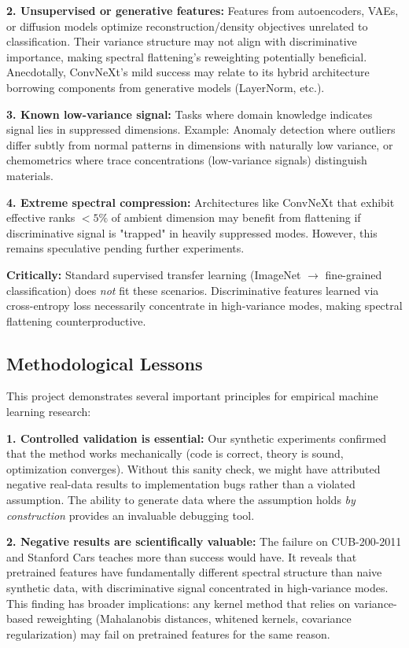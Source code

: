 \documentclass[11pt]{article}
\begin{document}
\textbf{2. Unsupervised or generative features:} Features from autoencoders, VAEs, or diffusion models optimize reconstruction/density objectives unrelated to classification. Their variance structure may not align with discriminative importance, making spectral flattening's reweighting potentially beneficial. Anecdotally, ConvNeXt's mild success may relate to its hybrid architecture borrowing components from generative models (LayerNorm, etc.).

\textbf{3. Known low-variance signal:} Tasks where domain knowledge indicates signal lies in suppressed dimensions. Example: Anomaly detection where outliers differ subtly from normal patterns in dimensions with naturally low variance, or chemometrics where trace concentrations (low-variance signals) distinguish materials.

\textbf{4. Extreme spectral compression:} Architectures like ConvNeXt that exhibit effective ranks $< 5\%$ of ambient dimension may benefit from flattening if discriminative signal is "trapped" in heavily suppressed modes. However, this remains speculative pending further experiments.

\textbf{Critically:} Standard supervised transfer learning (ImageNet $\to$ fine-grained classification) does \emph{not} fit these scenarios. Discriminative features learned via cross-entropy loss necessarily concentrate in high-variance modes, making spectral flattening counterproductive.

\subsection{Methodological Lessons}

This project demonstrates several important principles for empirical machine learning research:

\textbf{1. Controlled validation is essential:} Our synthetic experiments confirmed that the method works mechanically (code is correct, theory is sound, optimization converges). Without this sanity check, we might have attributed negative real-data results to implementation bugs rather than a violated assumption. The ability to generate data where the assumption holds \emph{by construction} provides an invaluable debugging tool.

\textbf{2. Negative results are scientifically valuable:} The failure on CUB-200-2011 and Stanford Cars teaches more than success would have. It reveals that pretrained features have fundamentally different spectral structure than naive synthetic data, with discriminative signal concentrated in high-variance modes. This finding has broader implications: any kernel method that relies on variance-based reweighting (Mahalanobis distances, whitened kernels, covariance regularization) may fail on pretrained features for the same reason.
\end{document}
